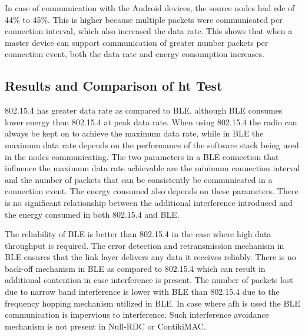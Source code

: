In case of communication with the Android devices, the source nodes had \gls{rdc} of 44\% to 45\%. This is higher because multiple packets were communicated per connection interval, which also increased the data rate. This shows that when a master device can support communication of greater number packets per connection event, both the data rate and energy consumption increases.

%

\subsection{Results and Comparison of \texorpdfstring{\acrlong{ht}}{High-Throughput} Test}

802.15.4 has greater data rate as compared to BLE, although BLE consumes lower energy than 802.15.4 at peak data rate. When using 802.15.4 the radio can always be kept on to achieve the maximum data rate, while in BLE the maximum data rate depends on the performance of the software stack being used in the nodes communicating. The two parameters in a BLE connection that influence the maximum data rate  achievable are the minimum connection interval and the number of packets that can be consistently be communicated in a connection event. The energy consumed also depends on these parameters. There is no significant relationship between the additional interference introduced and the energy consumed in both 802.15.4 and BLE. 

The reliability of BLE is better than 802.15.4 in the case where high data throughput is required. The error detection and retransmission mechanism in BLE ensures that the link layer delivers any data it receives reliably. There is no back-off mechanism in BLE as compared to 802.15.4 which can result in additional contention in case interference is present. The number of packets lost due to narrow band interference is lower with BLE than 802.15.4 due to the frequency hopping mechanism utilized in BLE. In case where \gls{afh} is used the BLE communication is impervious to interference. Such interference avoidance mechanism is not present in Null-RDC or ContikiMAC.

